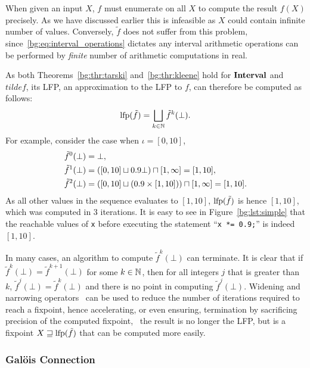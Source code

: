 When given an input $X$, $f$ must enumerate on all $X$ to compute the result
$f(X)$ precisely.  As we have discussed earlier this is infeasible as $X$
could contain infinite number of values.  Conversely, $\tilde{f}$ does not
suffer from this problem, since~\eqref{bg:eq:interval_operations} dictates any
interval arithmetic operations can be performed by \emph{finite} number of
arithmetic computations in real.

As both Theorems~\ref{bg:thr:tarski} and~\ref{bg:thr:kleene} hold for
$\mathbf{Interval}$ and $tilde{f}$, its LFP, an approximation to the LFP to $f$, can
therefore be computed as follows:
\begin{equation}
    \operatorname{\mathrm{lfp}} (\tilde{f}) = \bigsqcup_{k \in \mathbb{N}} \tilde{f}^k (\bot).
\end{equation}
For example, consider the case when $\iota = [0, 10]$,
\begin{equation}
    \begin{aligned}
        \tilde{f}^0 (\bot) &= \bot, \\
        \tilde{f}^1 (\bot) &= \left(
                [0, 10] \sqcup 0.9 \bot
            \right) \sqcap [1, \infty] = [1, 10], \\
        \tilde{f}^2 (\bot) &= \left(
                [0, 10] \sqcup \left( 0.9 \times [1, 10] \right)
            \right) \sqcap [1, \infty] = [1, 10].
    \end{aligned}
\end{equation}
As all other values in the sequence evaluates to $[1, 10]$, $\operatorname{\mathrm{lfp}}(\tilde{f})$
is hence $[1, 10]$, which was computed in 3 iterations.  It is easy to see
in Figure~\ref{bg:lst:simple} that the reachable values of \verb|x| before
executing the statement ``\verb|x *= 0.9;|'' is indeed $[1, 10]$.

In many cases, an algorithm to compute $\tilde{f}^k(\bot)$ can terminate.
It is clear that if $\tilde{f}^k(\bot) = \tilde{f}^{k+1}(\bot)$ for some
$k \in \mathbb{N}$, then for all integers $j$ that is greater than $k$,
$\tilde{f}^{j}(\bot) = \tilde{f}^{k}(\bot)$ and there is no point in computing
$\tilde{f}^{j}(\bot)$.  Widening and narrowing operators~\cite{cousot77,
nielson99} can be used to reduce the number of iterations required to reach
a fixpoint, hence accelerating, or even ensuring, termination by sacrificing
precision of the computed fixpoint, \ie~the result is no longer the LFP, but is
a fixpoint $X \sqsupseteq \operatorname{\mathrm{lfp}}(\tilde{f})$ that can be computed more easily.

\subsubsection{Gal\"ois Connection}
\label{bg:ssub:galois}

